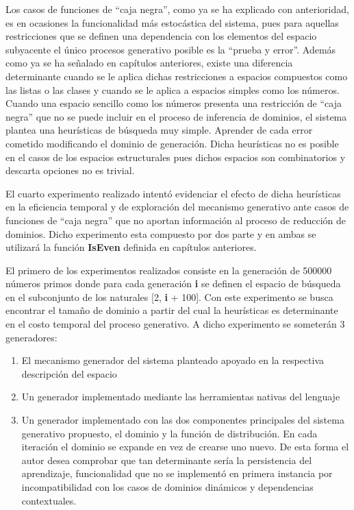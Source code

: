 Los casos de funciones de “caja negra”, como ya se ha explicado con anterioridad, es en ocasiones la
funcionalidad más estocástica del sistema, pues para aquellas restricciones que se definen una dependencia
con los elementos del espacio subyacente el único procesos generativo posible es la “prueba y error”.
Además como ya se ha señalado en capítulos anteriores, existe una diferencia determinante cuando se le
aplica dichas restricciones a espacios compuestos como las listas o las clases y cuando se le aplica a
espacios simples como los números. Cuando una espacio sencillo como los números presenta una restricción
de “caja negra” que no se puede incluir en el proceso de inferencia de dominios, el sistema plantea una
heurísticas de búsqueda muy simple. Aprender de cada error cometido modificando el dominio de generación.
Dicha heurísticas no es posible en el casos de los espacios estructurales pues dichos espacios son
combinatorios y descarta opciones no es trivial.

El cuarto experimento realizado intentó evidenciar el efecto de dicha heurísticas en la eficiencia temporal
y de exploración del mecanismo generativo ante casos de funciones de ``caja negra'' que no aportan información
al proceso de reducción de dominios. Dicho experimento esta compuesto por dos parte y en ambas se utilizará
la función {\bf IsEven} definida en capítulos anteriores.

El primero de los experimentos realizados consiste en la generación de 500000 números primos donde para cada
generación {\bf i} se definen el espacio de búsqueda en el subconjunto de los naturales [2, {\bf i} + 100]. Con este
experimento se busca encontrar el tamaño de dominio a partir del cual la heurísticas es determinante en el
costo temporal del proceso generativo. A dicho experimento se someterán 3 generadores:
\begin{enumerate}

      \item  El mecanismo generador del sistema planteado apoyado en la respectiva descripción del espacio
      \item  Un generador implementado mediante las herramientas nativas del lenguaje
      \item  Un generador implementado con las dos componentes principales del sistema generativo propuesto, el
            dominio y la función de distribución. En cada iteración el dominio se expande en vez
            de crearse uno nuevo. De esta forma el autor desea comprobar que tan determinante sería la persistencia del
            aprendizaje, funcionalidad que no se implementó en primera instancia por incompatibilidad con los casos de
            dominios dinámicos y dependencias contextuales.
\end{enumerate}

